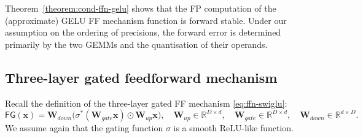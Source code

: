 \documentclass[namedate,webpdf,imanum]{ima-authoring-template}
\newcommand{\Real}{\mathbb{R}}
\newcommand{\Matrix}[1]{\mathbf{#1}}
\newcommand{\hap}{\mathbin{\odot}}
\newcommand{\Layer}[1]{\mathsf{#1}}
\numberwithin{equation}{section}
\begin{document}
Theorem~\ref{theorem:cond-ffn-gelu} shows that the FP computation of the (approximate) GELU FF mechanism function is forward stable.
Under our assumption on the ordering of precisions, the forward error is determined primarily by the two GEMMs and the quantisation of their operands.

\subsection{Three-layer gated feedforward mechanism}
Recall the definition of the three-layer gated FF mechanism \eqref{eq:ffn-swiglu}:
\begin{equation*}
    \Layer{FG}(\Matrix{x}) = \Matrix{W}_{down} \Big( \sigma^\ast(\Matrix{W}_{gate}\Matrix{x}) \hap \Matrix{W}_{up} \Matrix{x} \Big), \quad \Matrix{W}_{up} \in \Real^{D \times d}, \quad \Matrix{W}_{gate} \in \Real^{D \times d}, \quad \Matrix{W}_{down} \in \Real^{d \times D}.
\end{equation*}
We assume again that the gating function $\sigma$ is a smooth ReLU-like function.
\end{document}
